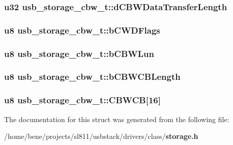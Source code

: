 \subsubsection{\setlength{\rightskip}{0pt plus 5cm}u32 {\bf usb\_\-storage\_\-cbw\_\-t::d\-CBWData\-Transfer\-Length}}\label{structusb__storage__cbw__t_03904c09dd6f942bec51cbf0dbc112e3}


\subsubsection{\setlength{\rightskip}{0pt plus 5cm}u8 {\bf usb\_\-storage\_\-cbw\_\-t::b\-CWDFlags}}\label{structusb__storage__cbw__t_0b147ba046d8898bd3b64d709a6c12d4}


\subsubsection{\setlength{\rightskip}{0pt plus 5cm}u8 {\bf usb\_\-storage\_\-cbw\_\-t::b\-CBWLun}}\label{structusb__storage__cbw__t_5a30c52c921d8253a586c84207216997}


\subsubsection{\setlength{\rightskip}{0pt plus 5cm}u8 {\bf usb\_\-storage\_\-cbw\_\-t::b\-CBWCBLength}}\label{structusb__storage__cbw__t_4b27476d6594da8639355b86493f3a4e}


\subsubsection{\setlength{\rightskip}{0pt plus 5cm}u8 {\bf usb\_\-storage\_\-cbw\_\-t::CBWCB}[16]}\label{structusb__storage__cbw__t_47dfef9abc873791f72d8579af1e0387}




The documentation for this struct was generated from the following file:\begin{CompactItemize}
\item 
/home/bene/projects/sl811/usbstack/drivers/class/{\bf storage.h}\end{CompactItemize}
